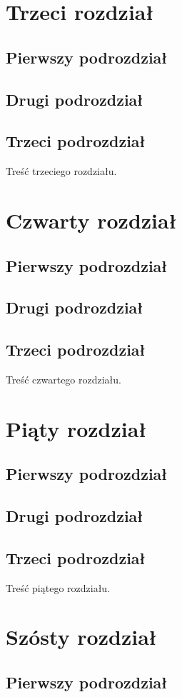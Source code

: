 \documentclass[12pt,a4paper,titlepage]{report}
\begin{document}
\newpage
\chapter{Trzeci rozdział}
\section{Pierwszy podrozdział}
\section{Drugi podrozdział}
\section{Trzeci podrozdział}
Treść trzeciego rozdziału.
\newpage
\chapter{Czwarty rozdział}
\section{Pierwszy podrozdział}
\section{Drugi podrozdział}
\section{Trzeci podrozdział}
Treść czwartego rozdziału.
\newpage
\chapter{Piąty rozdział}
\section{Pierwszy podrozdział}
\section{Drugi podrozdział}
\section{Trzeci podrozdział}
Treść piątego rozdziału.
\newpage
\chapter{Szósty rozdział}
\section{Pierwszy podrozdział}
\end{document}
